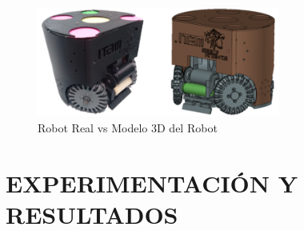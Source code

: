 \documentclass[twocolumn,10pt]{amrob}
\begin{document}
\begin{figure}
  \centering
    \includegraphics[width=8cm]{realVS3D.png}
  \caption{Robot Real vs Modelo 3D del Robot}
  \label{fig:ModRealVSdes}
\end{figure}

\section*{EXPERIMENTACIÓN Y RESULTADOS}
\end{document}
